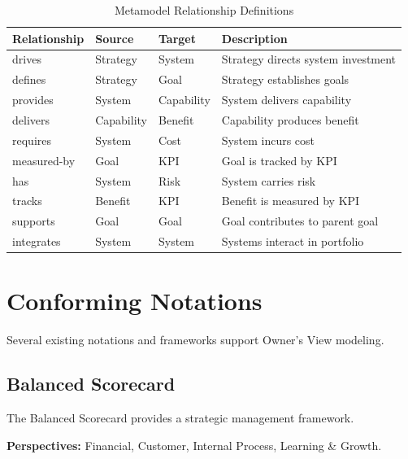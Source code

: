 \documentclass[11pt,letterpaper]{article}
\begin{document}
\begin{table}[H]
\centering
\caption{Metamodel Relationship Definitions}
\small
\begin{tabular}{@{}L{2.3cm}L{1.8cm}L{1.8cm}L{7.5cm}@{}}
\toprule
\textbf{Relationship} & \textbf{Source} & \textbf{Target} & \textbf{Description} \\
\midrule
drives & Strategy & System & Strategy directs system investment \\
\addlinespace
defines & Strategy & Goal & Strategy establishes goals \\
\addlinespace
provides & System & Capability & System delivers capability \\
\addlinespace
delivers & Capability & Benefit & Capability produces benefit \\
\addlinespace
requires & System & Cost & System incurs cost \\
\addlinespace
measured-by & Goal & KPI & Goal is tracked by KPI \\
\addlinespace
has & System & Risk & System carries risk \\
\addlinespace
tracks & Benefit & KPI & Benefit is measured by KPI \\
\addlinespace
supports & Goal & Goal & Goal contributes to parent goal \\
\addlinespace
integrates & System & System & Systems interact in portfolio \\
\bottomrule
\end{tabular}
\end{table}

\section{Conforming Notations}

Several existing notations and frameworks support Owner's View modeling.

\subsection{Balanced Scorecard}

The Balanced Scorecard provides a strategic management framework.

\textbf{Perspectives:} Financial, Customer, Internal Process, Learning \& Growth.
\end{document}
